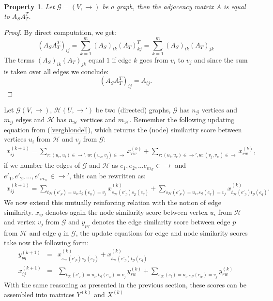 \documentclass[a4paper,11pt]{report}
\newtheorem{property}[theorem]{Property}
\newcommand{\graf}{\mathscr{G}}
\newcommand{\grafeen}{\mathscr{H}}
\begin{document}
\begin{property}\label{adjacencyprop}
  Let $\graf =(V,\to)$ be a graph, then the adjacency matrix $A$ is equal to 
  $A_SA^T_T$.
\end{property}
\begin{proof}
  By direct computation, we get:
  $$(A_SA_T^T)_{ij} = \sum^m_{k=1}(A_S)_{ik}(A_T)^T_{kj} = \sum^m_{k=1}(A_S)_{ik}(A_T)_{jk}$$
The terms $(A_S)_{ik}(A_T)_{jk}$ equal $1$ if edge $k$ goes from $v_i$ to 
$v_j$ and since the sum is taken over all edges we conclude:
$$(A_SA_T^T)_{ij} = A_{ij}.$$
\end{proof}
Let  $\graf(V,\to)$, $\grafeen(U,\to')$ be two (directed) graphs, $\graf$ has $n_\graf$ vertices and $m_\graf$ edges and $\grafeen$ has $n_\grafeen$ vertices and $m_\grafeen$. 
Remember the following updating equation from (\ref{vergblondel}), which returns the 
(node) similarity score between vertices $u_i$ 
from $\grafeen$ and $v_j$ from $\graf$:
\begin{eqnarray*}
 x^{(k+1)}_{ij} = \sum_{r:(u_r,u_i)\in \to', w:(v_w,v_j) \in \to} x^{(k)}_{rw} +  \sum_{r:(u_i,u_r)\in \to', w:(v_j,v_w) \in \to} 
 x^{(k)}_{rw},
 \end{eqnarray*} 
if we number the edges of $\graf$ and $\grafeen$ as  $e_1, e_2, \ldots e_{m_\graf}  \in \to$ and $e'_1, e'_2, \ldots, e'_{m_\grafeen}  \in \to'$, this can be rewritten as:
 \begin{eqnarray*}
 x^{(k+1)}_{ij} = \sum_{t_\grafeen(e'_p)=u_i, t_\graf(e_q)=v_j} x^{(k)}_{s_\grafeen(e'_p)s_\graf(e_q)} +  \sum_{s_\grafeen(e'_p)=u_i, s_\graf(e_q)=v_j} 
 x^{(k)}_{t_\grafeen(e'_p)t_\graf(e_q)}.
 \end{eqnarray*} 
 We now extend this mutually reinforcing relation with the notion of edge 
 similarity. $x_{ij}$ denotes again the node similarity score between vertex $u_i$ from $\grafeen$ and vertex $v_j$ from $\graf$ 
 and $y_{pq}$ denotes the edge similarity score between edge $p$ from $\grafeen$ and edge $q$ in $\graf$, the update equations for edge and node similarity scores take now the 
 following form:
 \begin{eqnarray}
 y_{pq}^{(k+1)} &=& x^{(k)}_{s_\grafeen(e'_p)s_\graf(e_q)} + x^{(k)}_{t_\grafeen(e'_p)t_\graf(e_q)}\label{edge1}\\
 x^{(k+1)}_{ij} &=& \sum_{t_\grafeen(e'_r)=u_i, t_\graf(e_w)=v_j} y^{(k)}_{rw} +  \sum_{s_\grafeen(e_t)=u_i, s_\graf(e_w)=v_j} y^{(k)}_{rw} \label{edge2}
 \end{eqnarray} 
With the same 
 reasoning as presented in the previous section, these scores can be assembled into matrices $Y^{(k)}$ and $X^{(k)}$ 
\end{document}
